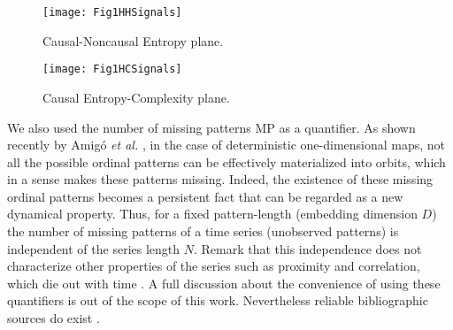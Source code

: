 \begin{figure}[htpb]
	\centering	
	\texttt{[image: Fig1HHSignals]}
	\caption{Causal-Noncausal Entropy plane.}
\label{fig:HH}
\end{figure}
	
	
\begin{figure}[htpb]
	\centering		
	\texttt{[image: Fig1HCSignals]}
	\caption{Causal Entropy-Complexity plane.}
	\label{fig:HC}
\end{figure}

We also used the number of missing patterns MP as a quantifier\cite{Rosso2012}.
As shown recently by Amig\'o {\it et al.} \cite{Amigo2006,Amigo2007,Amigo2008,Amigo2010}, in the case of deterministic one-dimensional maps, not all the possible ordinal patterns can be effectively materialized into orbits, which in a sense makes these patterns missing.
Indeed, the existence of these missing ordinal patterns becomes a persistent fact that can be regarded as a new dynamical property.
Thus, for a fixed pattern-length (embedding dimension $D$) the number of missing patterns of a time series (unobserved patterns) is independent of the series length $N$.
Remark that this independence does not characterize other properties of the series such as proximity and correlation, which die out with time \cite{Amigo2007,Amigo2010}.
A full discussion about the convenience of using these quantifiers is out of the scope of this work.
Nevertheless reliable bibliographic sources do exist \cite{Wackerbauer1994,Lopez-Ruiz1995,Rosso2007A,DeMicco2008,Rosso2010,Martin2006,Rosso2012}.


